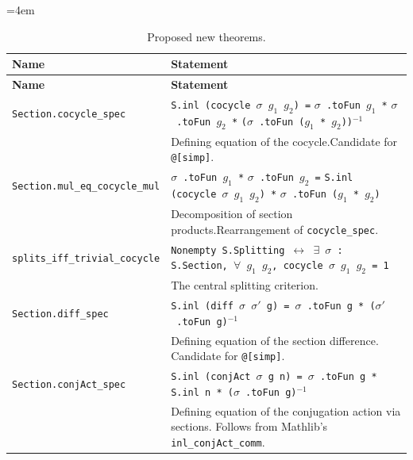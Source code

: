 \documentclass[11pt]{article}
\begin{document}
{\small\begingroup\emergencystretch=4em
\begin{longtable}{@{}>{\raggedright\arraybackslash}p{}>{\raggedright\arraybackslash}p{}@{}}
\caption{Proposed new theorems.}\label{tab:api-thms} \\
\toprule
\textbf{Name} & \textbf{Statement} \\
\midrule
\endfirsthead
\toprule
\textbf{Name} & \textbf{Statement} \\
\midrule
\endhead

\texttt{Section.cocycle\_spec}
  & \texttt{S.inl (cocycle $\sigma$ $g_1$ $g_2$) =}\linebreak
    \texttt{$\sigma$\,.toFun $g_1$ *}\linebreak
    \texttt{$\sigma$\,.toFun $g_2$ *}\linebreak
    \texttt{($\sigma$\,.toFun ($g_1$ * $g_2$))$^{-1}$} \\[4pt]
  & \small Defining equation of the cocycle.\linebreak Candidate for \texttt{@[simp]}. \\[6pt]

\texttt{Section.mul\_eq\_cocycle\_mul}
  & \texttt{$\sigma$\,.toFun $g_1$ *}\linebreak
    \texttt{$\sigma$\,.toFun $g_2$ =}\linebreak
    \texttt{S.inl (cocycle $\sigma$ $g_1$ $g_2$) *}\linebreak
    \texttt{$\sigma$\,.toFun ($g_1$ * $g_2$)} \\[4pt]
  & \small Decomposition of section products.\linebreak Rearrangement of \texttt{cocycle\_spec}. \\[6pt]

\texttt{splits\_iff\_trivial\_cocycle}
  & \texttt{Nonempty S.Splitting $\leftrightarrow$ $\exists$ $\sigma$ : S.Section, $\forall$ $g_1$ $g_2$, cocycle $\sigma$ $g_1$ $g_2$ = 1} \\[4pt]
  & \small The central splitting criterion. \\[6pt]

\texttt{Section.diff\_spec}
  & \texttt{S.inl (diff $\sigma$ $\sigma'$ g) = $\sigma$\,.toFun g * ($\sigma'$\,.toFun g)$^{-1}$} \\[4pt]
  & \small Defining equation of the section difference. Candidate for \texttt{@[simp]}. \\[6pt]

\texttt{Section.conjAct\_spec}
  & \texttt{S.inl (conjAct $\sigma$ g n) = $\sigma$\,.toFun g * S.inl n * ($\sigma$\,.toFun g)$^{-1}$} \\[4pt]
  & \small Defining equation of the conjugation action via sections. Follows from
    Mathlib's \texttt{inl\_conjAct\_comm}. \\[6pt]


\end{longtable}}
\end{document}
